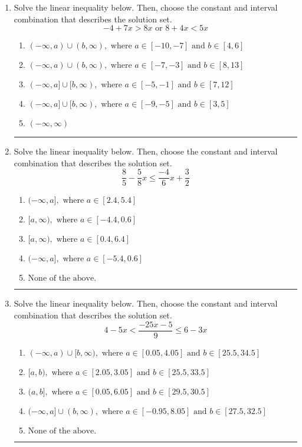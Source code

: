 \documentclass[14pt]{extbook}
\newcommand{\litem}[1]{\item#1\hspace*{-1cm}\rule{\textwidth}{0.4pt}}
\begin{document}
\begin{enumerate}
{\begin{enumerate}[label=\Alph*.]
\end{enumerate} }
\litem{
Solve the linear inequality below. Then, choose the constant and interval combination that describes the solution set.\[ -4 + 7 x > 8 x \text{ or } 8 + 4 x < 5 x \]\begin{enumerate}[label=\Alph*.]
\item \( (-\infty, a) \cup (b, \infty), \text{ where } a \in [-10, -7] \text{ and } b \in [4, 6] \)
\item \( (-\infty, a) \cup (b, \infty), \text{ where } a \in [-7, -3] \text{ and } b \in [8, 13] \)
\item \( (-\infty, a] \cup [b, \infty), \text{ where } a \in [-5, -1] \text{ and } b \in [7, 12] \)
\item \( (-\infty, a] \cup [b, \infty), \text{ where } a \in [-9, -5] \text{ and } b \in [3, 5] \)
\item \( (-\infty, \infty) \)

\end{enumerate} }
\litem{
Solve the linear inequality below. Then, choose the constant and interval combination that describes the solution set.\[ \frac{8}{5} - \frac{5}{8} x \leq \frac{-4}{6} x + \frac{3}{2} \]\begin{enumerate}[label=\Alph*.]
\item \( (-\infty, a], \text{ where } a \in [2.4, 5.4] \)
\item \( [a, \infty), \text{ where } a \in [-4.4, 0.6] \)
\item \( [a, \infty), \text{ where } a \in [0.4, 6.4] \)
\item \( (-\infty, a], \text{ where } a \in [-5.4, 0.6] \)
\item \( \text{None of the above}. \)

\end{enumerate} }
\litem{
Solve the linear inequality below. Then, choose the constant and interval combination that describes the solution set.\[ 4 - 5 x < \frac{-25 x - 5}{9} \leq 6 - 3 x \]\begin{enumerate}[label=\Alph*.]
\item \( (-\infty, a) \cup [b, \infty), \text{ where } a \in [0.05, 4.05] \text{ and } b \in [25.5, 34.5] \)
\item \( [a, b), \text{ where } a \in [2.05, 3.05] \text{ and } b \in [25.5, 33.5] \)
\item \( (a, b], \text{ where } a \in [0.05, 6.05] \text{ and } b \in [29.5, 30.5] \)
\item \( (-\infty, a] \cup (b, \infty), \text{ where } a \in [-0.95, 8.05] \text{ and } b \in [27.5, 32.5] \)
\item \( \text{None of the above.} \)


\end{enumerate}}
\end{enumerate}
\end{document}
